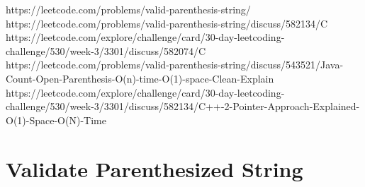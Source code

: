 https://leetcode.com/problems/valid-parenthesis-string/
https://leetcode.com/problems/valid-parenthesis-string/discuss/582134/C%
https://leetcode.com/explore/challenge/card/30-day-leetcoding-challenge/530/week-3/3301/discuss/582074/C%
https://leetcode.com/problems/valid-parenthesis-string/discuss/543521/Java-Count-Open-Parenthesis-O(n)-time-O(1)-space-Clean-Explain
https://leetcode.com/explore/challenge/card/30-day-leetcoding-challenge/530/week-3/3301/discuss/582134/C++-2-Pointer-Approach-Explained-O(1)-Space-O(N)-Time

\chapter{Validate Parenthesized String}
\label{ch:valid_parenthesis}


